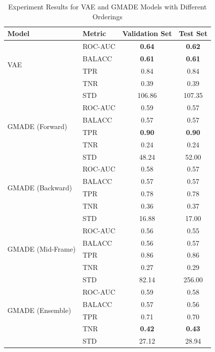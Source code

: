 \begin{table}[h!]
    \centering
    \caption{Experiment Results for VAE and GMADE Models with Different Orderings}
    \begin{tabular}{|l|l|c|c|}
    \hline
    \textbf{Model} & \textbf{Metric} & \textbf{Validation Set} & \textbf{Test Set} \\
    \hline
    \multirow{4}{*}{VAE} 
    & ROC-AUC & \textbf{0.64} & \textbf{0.62} \\
    & BALACC  & \textbf{0.61} & \textbf{0.61} \\
    & TPR     & 0.84 & 0.84 \\
    & TNR     & 0.39 & 0.39 \\
    & STD     & 106.86 & 107.35 \\
    \hline
    \multirow{4}{*}{GMADE (Forward)}
    & ROC-AUC & 0.59 & 0.57 \\
    & BALACC  & 0.57 & 0.57 \\
    & TPR     & \textbf{0.90} & \textbf{0.90} \\
    & TNR     & 0.24 & 0.24 \\
    & STD     & 48.24 & 52.00 \\
    \hline
    \multirow{4}{*}{GMADE (Backward)}
    & ROC-AUC & 0.58 & 0.57 \\
    & BALACC  & 0.57 & 0.57 \\
    & TPR     & 0.78 & 0.78 \\
    & TNR     & 0.36 & 0.37 \\
    & STD     & 16.88 & 17.00 \\
    \hline
    \multirow{4}{*}{GMADE (Mid-Frame)}
    & ROC-AUC & 0.56 & 0.55 \\
    & BALACC  & 0.56 & 0.57 \\
    & TPR     & 0.86 & 0.86 \\
    & TNR     & 0.27 & 0.29 \\
    & STD     & 82.14 & 256.00 \\
    \hline
    \multirow{4}{*}{GMADE (Ensemble)}
    & ROC-AUC & 0.59 & 0.58 \\
    & BALACC  & 0.57 & 0.56 \\
    & TPR     & 0.71 & 0.70 \\
    & TNR     & \textbf{0.42} & \textbf{0.43} \\
    & STD     & 27.12 & 28.94 \\
    \hline
    \end{tabular}
    \label{fig:generalization}
\end{table}

